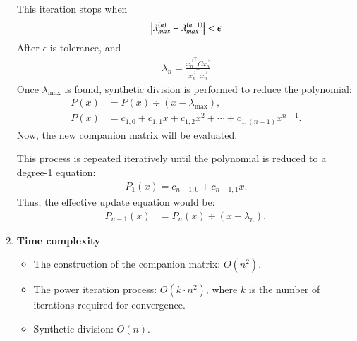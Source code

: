 \documentclass[journal]{IEEEtran}
\numberwithin{equation}{enumi}
\numberwithin{figure}{enumi}
\begin{document}
\begin{enumerate}
     This iteration stops when
     \begin{align}
         \left\vert\lambda_{max}^{\left(n\right)} - \lambda_{max}^{\left(n - 1\right)}\right\vert < \epsilon
     \end{align}
     After $\epsilon$ is tolerance, and 
     \begin{align}
         \lambda_n = \frac{\vec{x_n}^{\top} C \vec{x_n}}{\vec{x_n}^{\top}\vec{x_n}}
     \end{align}
     Once $\lambda_{\text{max}}$ is found, synthetic division is performed to reduce the polynomial:
     \begin{align}
     	P(x) &= P(x) \div (x - \lambda_{\text{max}}), \\
     	P(x) &= c_{1,0} + c_{1,1}x + c_{1,2}x^{2} + \cdots + c_{1,(n-1)}x^{n-1}.
     \end{align}
     Now, the new companion matrix will be evaluated.  
     
     This process is repeated iteratively until the polynomial is reduced to a degree-1 equation:
     \begin{align}
     	P_1(x) = c_{n-1,0} + c_{n-1,1}x.
     \end{align}
     Thus, the effective update equation would be:
     \begin{align}
     	P_{n-1}(x) &= P_{n}(x) \div (x - \lambda_{n}),
     \end{align}
     \item \textbf{Time complexity}
     \begin{itemize}
        \item The construction of the companion matrix: $O(n^2)$.
        \item The power iteration process: $O(k \cdot n^2)$, where $k$ is the number of iterations required for convergence.
        \item Synthetic division: $O(n)$.
     \end{itemize}     
\end{enumerate}
\end{document}
